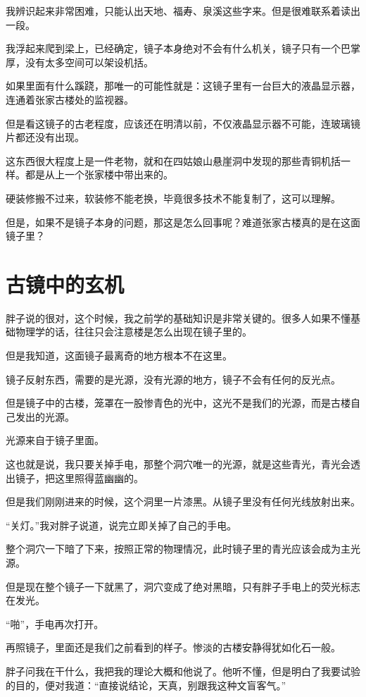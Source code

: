 我辨识起来非常困难，只能认出天地、福寿、泉溪这些字来。但是很难联系着读出一段。

我浮起来爬到梁上，已经确定，镜子本身绝对不会有什么机关，镜子只有一个巴掌厚，没有太多空间可以架设机括。

如果里面有什么蹊跷，那唯一的可能性就是：这镜子里有一台巨大的液晶显示器，连通着张家古楼处的监视器。

但是看这镜子的古老程度，应该还在明清以前，不仅液晶显示器不可能，连玻璃镜片都还没有出现。

这东西很大程度上是一件老物，就和在四姑娘山悬崖洞中发现的那些青铜机括一样。都是从上一个张家楼中带出来的。

硬装修搬不过来，软装修不能老换，毕竟很多技术不能复制了，这可以理解。

但是，如果不是镜子本身的问题，那这是怎么回事呢？难道张家古楼真的是在这面镜子里？

\chapter{古镜中的玄机}

胖子说的很对，这个时候，我之前学的基础知识是非常关键的。很多人如果不懂基础物理学的话，往往只会注意楼是怎么出现在镜子里的。

但是我知道，这面镜子最离奇的地方根本不在这里。

镜子反射东西，需要的是光源，没有光源的地方，镜子不会有任何的反光点。

但是镜子中的古楼，笼罩在一股惨青色的光中，这光不是我们的光源，而是古楼自己发出的光源。

光源来自于镜子里面。

这也就是说，我只要关掉手电，那整个洞穴唯一的光源，就是这些青光，青光会透出镜子，把这里照得蓝幽幽的。

但是我们刚刚进来的时候，这个洞里一片漆黑。从镜子里没有任何光线放射出来。

“关灯。”我对胖子说道，说完立即关掉了自己的手电。

整个洞穴一下暗了下来，按照正常的物理情况，此时镜子里的青光应该会成为主光源。

但是现在整个镜子一下就黑了，洞穴变成了绝对黑暗，只有胖子手电上的荧光标志在发光。

“啪”，手电再次打开。

再照镜子，里面还是我们之前看到的样子。惨淡的古楼安静得犹如化石一般。

胖子问我在干什么，我把我的理论大概和他说了。他听不懂，但是明白了我要试验的目的，便对我道：“直接说结论，天真，别跟我这种文盲客气。”

